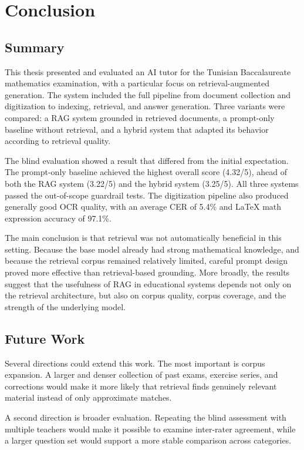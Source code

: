 \chapter{Conclusion}
\label{chap:conclusion}

\section{Summary}
\label{sec:summary}

This thesis presented and evaluated an AI tutor for the Tunisian
Baccalaureate mathematics examination, with a particular focus on
retrieval-augmented generation. The system included the full pipeline from
document collection and digitization to indexing, retrieval, and answer
generation. Three variants were compared: a RAG system grounded in
retrieved documents, a prompt-only baseline without retrieval, and a hybrid
system that adapted its behavior according to retrieval quality.

The blind evaluation showed a result that differed from the initial
expectation. The prompt-only baseline achieved the highest overall score
(4.32/5), ahead of both the RAG system (3.22/5) and the hybrid system
(3.25/5). All three systems passed the out-of-scope guardrail tests. The
digitization pipeline also produced generally good OCR quality, with an
average CER of 5.4\% and \LaTeX{} math expression accuracy of 97.1\%.

The main conclusion is that retrieval was not automatically beneficial in
this setting. Because the base model already had strong mathematical
knowledge, and because the retrieval corpus remained relatively limited,
careful prompt design proved more effective than retrieval-based grounding.
More broadly, the results suggest that the usefulness of RAG in educational
systems depends not only on the retrieval architecture, but also on corpus
quality, corpus coverage, and the strength of the underlying model.

\section{Future Work}
\label{sec:future-work}

Several directions could extend this work. The most important is corpus
expansion. A larger and denser collection of past exams, exercise series,
and corrections would make it more likely that retrieval finds genuinely
relevant material instead of only approximate matches.

A second direction is broader evaluation. Repeating the blind assessment
with multiple teachers would make it possible to examine inter-rater
agreement, while a larger question set would support a more stable
comparison across categories.

